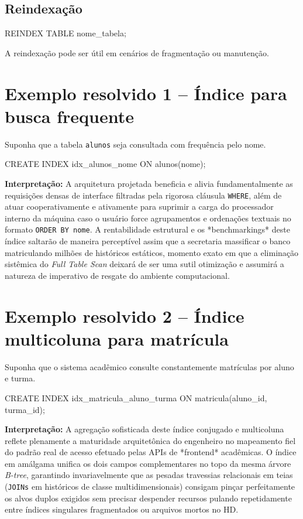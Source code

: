\subsection{Reindexação}

\begin{sqlcode}
REINDEX TABLE nome_tabela;
\end{sqlcode}

A reindexação pode ser útil em cenários de fragmentação ou manutenção.

\section{Exemplo resolvido 1 -- Índice para busca frequente}

Suponha que a tabela \texttt{alunos} seja consultada com frequência pelo nome.

\begin{sqlcode}
CREATE INDEX idx_alunos_nome
ON alunos(nome);
\end{sqlcode}

\textbf{Interpretação:}
A arquitetura projetada beneficia e alivia fundamentalmente as requisições densas de interface filtradas pela rigorosa cláusula \texttt{WHERE}, além de atuar cooperativamente e ativamente para suprimir a carga do processador interno da máquina caso o usuário force agrupamentos e ordenações textuais no formato \texttt{ORDER BY nome}. A rentabilidade estrutural e os *benchmarkings* deste índice saltarão de maneira perceptível assim que a secretaria massificar o banco matriculando milhões de históricos estáticos, momento exato em que a eliminação sistêmica do \textit{Full Table Scan} deixará de ser uma sutil otimização e assumirá a natureza de imperativo de resgate do ambiente computacional.

\section{Exemplo resolvido 2 -- Índice multicoluna para matrícula}

Suponha que o sistema acadêmico consulte constantemente matrículas por aluno e turma.

\begin{sqlcode}
CREATE INDEX idx_matricula_aluno_turma
ON matricula(aluno_id, turma_id);
\end{sqlcode}

\textbf{Interpretação:}
A agregação sofisticada deste índice conjugado e multicoluna reflete plenamente a maturidade arquitetônica do engenheiro no mapeamento fiel do padrão real de acesso efetuado pelas APIs de *frontend* acadêmicas. O índice em amálgama unifica os dois campos complementares no topo da mesma árvore \textit{B-tree}, garantindo invariavelmente que as pesadas travessias relacionais em teias (\texttt{JOINs} em históricos de classe multidimensionais) consigam pinçar perfeitamente os alvos duplos exigidos sem precisar despender recursos pulando repetidamente entre índices singulares fragmentados ou arquivos mortos no HD.

